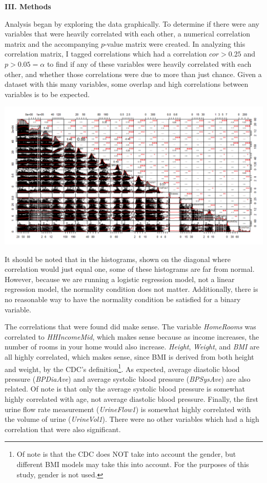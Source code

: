 \documentclass[letter,12pt]{article}
\begin{document}
	\begin{center}
		\textbf{III. Methods}
	\end{center}
	\justify
	Analysis began by exploring the data graphically. To determine if there were any variables that were heavily correlated with each other, a numerical correlation matrix and the accompanying $p$-value matrix were created. In analyzing this correlation matrix, I tagged correlations which had a correlation $cor > 0.25$ and $p > 0.05 = \alpha$ to find if any of these variables were heavily correlated with each other, and whether those correlations were due to more than just chance. Given a dataset with this many variables, some overlap and high correlations between variables is to be expected.\par
	\begin{center}
	\includegraphics[width=\textwidth]{img/corr.png}
	\end{center}
	It should be noted that in the histograms, shown on the diagonal where correlation would just equal one, some of these histograms are far from normal. However, because we are running a logistic regression model, not a linear regression model, the normality condition does not matter. Additionally, there is no reasonable way to have the normality condition be satisfied for a binary variable.\par
	The correlations that were found did make sense. The variable \textit{HomeRooms} was correlated to \textit{HHIncomeMid}, which makes sense because as income increases, the number of rooms in your home would also increase. \textit{Height}, \textit{Weight}, and \textit{BMI} are all highly correlated, which makes sense, since BMI is derived from both height and weight, by the CDC's definition\footnote{Of note is that the CDC does NOT take into account the gender, but different BMI models may take this into account. For the purposes of this study, gender is not used.}. As expected, average diastolic blood pressure (\textit{BPDiaAve}) and average systolic blood pressure (\textit{BPSysAve}) are also related. Of note is that only the average systolic blood pressure is somewhat highly correlated with age, not average diastolic blood pressure. Finally, the first urine flow rate measurement (\textit{UrineFlow1}) is somewhat highly correlated with the volume of urine (\textit{UrineVol1}). There were no other variables which had a high correlation that were also significant.\par
\end{document}

